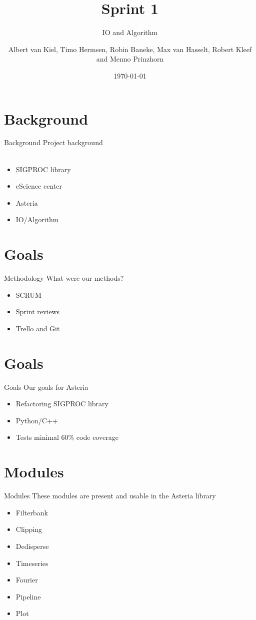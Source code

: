 \documentclass{beamer}
\title{Sprint 1}
\subtitle{IO and Algorithm}
\author{Albert van Kiel, Timo Hermsen, Robin Baneke, Max van Hasselt, Robert Kleef and Menno Prinzhorn}
\date{\today}
\begin{document}
\begin{frame}
    \titlepage
\end{frame}

\section{Background}
    
\begin{frame}{Background}
    Project background
    \\~\\
    \begin{itemize}
        \item SIGPROC library
        \item eScience center
        \item Asteria
        \item IO/Algorithm
    \end{itemize}
\end{frame}

\section{Goals}
	\begin{frame}{Methodology}
	What were our methods?     
	\begin{itemize}
		\item SCRUM
		\item Sprint reviews
		\item Trello and Git
	\end{itemize}
\end{frame}

\section{Goals}
\begin{frame}{Goals}
    Our goals for Asteria      
    \begin{itemize}
        \item Refactoring SIGPROC library
        \item Python/C++
        \item Tests minimal 60\% code coverage
    \end{itemize}
\end{frame}

\section{Modules}
\begin{frame}{Modules}
	These modules are present and usable in the Asteria library     
	\begin{itemize}
		\item Filterbank
		\item Clipping
		\item Dedisperse
		\item Timeseries
		\item Fourier
		\item Pipeline
		\item Plot
	\end{itemize}
\end{frame}
\end{document}
